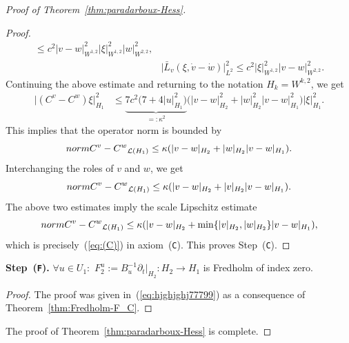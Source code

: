 \documentclass[10pt,a4paper]{amsart}
\def\abs#1{\mathopen|#1\mathclose|}
\newcommand{\Ll}{{\mathcal{L}}} %
\newcommand{\norm}{{\rm norm}}
\newcommand{\p}{{\partial}}
\begin{document}
\begin{proof}[Proof of Theorem~\ref{thm:paradarboux-Hess}]
\begin{proof}
\begin{equation*}
\begin{split}
\le c^2 \abs{v-w}_{W^{1,2}}^2 \abs{\xi}_{W^{1,2}}^2 \abs{w}_{W^{2,2}}^2,
\\
& \bigl|\bar L_v(\xi,\dot v-\dot w)\bigr|_{L^2}^2
\le c^2 \abs{\xi}_{W^{1,2}}^2\abs{v-w}_{W^{2,2}}^2.
\end{split}
\end{equation*}
Continuing the above estimate
and returning to the notation $H_k=W^{k,2}$, we get
\begin{equation*}
\begin{split}
 \abs{(C^v-C^w)\xi}_{H_1}^2
 &\le \underbrace{7 c^2 \bigl(7+4\abs{u}_{H_1}^2\bigr)}_{=:\kappa^2}
 \bigl(\abs{v-w}_{H_2}^2+\abs{w}_{H_2}^2\abs{v-w}_{H_1}^2\bigr)
 \abs{\xi}_{H_1}^2 .
\end{split}
\end{equation*}
This implies that the operator norm is bounded by
\[
 \norm{C^v-C^w}_{\Ll(H_1)}
 \le\kappa (\abs{v-w}_{H_2}+\abs{w}_{H_2}\abs{v-w}_{H_1} ).
\]
Interchanging the roles of $v$ and $w$, we get
\[
 \norm{C^v-C^w}_{\Ll(H_1)}
 \le\kappa (\abs{v-w}_{H_2}+\abs{v}_{H_2}\abs{v-w}_{H_1} ).
\]
The above two estimates imply the scale Lipschitz estimate
\begin{equation}\label{eq:C-paraDarboux}
 \norm{C^v-C^w}_{\Ll(H_1)}
 \le\kappa (\abs{v-w}_{H_2}
 +\min\{\abs{v}_{H_2},\abs{w}_{H_2}\}\abs{v-w}_{H_1}
 ),
\end{equation}
which is precisely~(\ref{eq:(C)}) in axiom~(\texttt{C}).
This proves Step~(\texttt{C}).
\end{proof}

\noindent
\textbf{Step~(\texttt{F}).} $\forall u\in U_1\colon$
$F^u_2:=B_u^{-1}\p_t |_{H_2}\colon H_2\to H_1$ is Fredholm of index zero.

\begin{proof}
The proof was given in~(\ref{eq:hjghjghj77799})
as a consequence of Theorem~\ref{thm:Fredholm-F_C}.
\end{proof}

The proof of Theorem~\ref{thm:paradarboux-Hess} is complete.
\end{proof}
\end{document}
